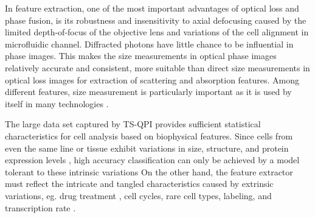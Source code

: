 \documentclass[aps,pra,reprint,superscriptaddress]{revtex4-1}
\begin{document}
In feature extraction, one of the most important advantages of optical loss and phase fusion, is its robustness and insensitivity to axial defocusing \cite{spadinger1990effect} caused by the limited depth-of-focus of the objective lens and variations of the cell alignment in microfluidic channel. Diffracted photons have little chance to be influential in phase images. This makes the size measurements in optical phase images relatively accurate and consistent, more suitable than direct size measurements in optical loss images for extraction of scattering and absorption features. Among different features, size measurement is particularly important as it is used by itself in many technologies \cite{adams2008highly, nagrath2007isolation, vona2000isolation, gossett2010label}.  

The large data set captured by TS-QPI provides sufficient statistical characteristics for cell analysis based on biophysical features. Since cells from even the same line or tissue exhibit variations in size, structure, and protein expression levels \cite{kaern2005stochasticity, maheshri2007living, zangle2014live}, high accuracy classification can only be achieved by a model tolerant to these intrinsic variations 
On the other hand, the feature extractor must reflect the intricate and tangled characteristics caused by extrinsic variations, eg. drug treatment \cite{spencer2009non}, cell cycles, rare cell types, labeling, and transcription rate \cite{johnston2012mitochondrial}. 
\end{document}
